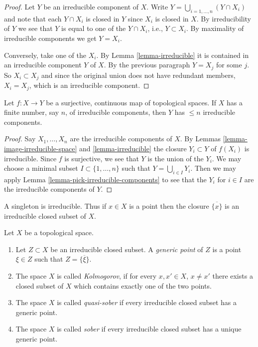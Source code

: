 \begin{proof}
Let $Y$ be an irreducible component of $X$. Write
$Y = \bigcup_{i = 1, \ldots, n} (Y \cap X_i)$
and note that each $Y \cap X_i$ is closed in $Y$ since $X_i$ is closed in $X$.
By irreducibility of $Y$ we see that $Y$ is equal to one of the $Y \cap X_i$,
i.e., $Y \subset X_i$.  By maximality of irreducible components we
get $Y = X_i$.

\medskip\noindent
Conversely, take one of the $X_i$. By Lemma \ref{lemma-irreducible} it is
contained in an irreducible component $Y$ of $X$. By the previous paragraph
$Y = X_j$ for some $j$. So $X_i \subset X_j$ and since the original union does
not have redundant members, $X_i = X_j$, which is an irreducible component.
\end{proof}

\begin{lemma}
\label{lemma-surjective-continuous-irreducible-components}
Let $f : X \to Y$ be a surjective, continuous map of topological spaces.
If $X$ has a finite number, say $n$, of irreducible components, then
$Y$ has $\leq n$ irreducible components.
\end{lemma}

\begin{proof}
Say $X_1, \ldots, X_n$ are the irreducible components of $X$.
By Lemmas \ref{lemma-image-irreducible-space} and \ref{lemma-irreducible}
the closure $Y_i \subset Y$ of $f(X_i)$ is irreducible.
Since $f$ is surjective, we see that $Y$ is the union of the $Y_i$.
We may choose a minimal subset $I \subset \{1, \ldots, n\}$
such that $Y = \bigcup_{i \in I} Y_i$. Then we may apply
Lemma \ref{lemma-pick-irreducible-components} to see that the $Y_i$
for $i \in I$ are the irreducible components of $Y$.
\end{proof}

\noindent
A singleton is irreducible. Thus if $x \in X$ is a point
then the closure $\overline{\{x\}}$ is an irreducible closed
subset of $X$.

\begin{definition}
\label{definition-generic-point}
Let $X$ be a topological space.
\begin{enumerate}
\item Let $Z \subset X$ be an irreducible closed subset.
A {\it generic point} of $Z$ is a point $\xi \in Z$ such
that $Z = \overline{\{\xi\}}$.
\item The space $X$ is called {\it Kolmogorov}, if for every $x, x' \in X$,
$x \not = x'$ there exists a closed subset of $X$ which contains
exactly one of the two points.
\item The space $X$ is called {\it quasi-sober} if every
irreducible closed subset has a generic point.
\item The space $X$ is called {\it sober} if every
irreducible closed subset has a unique generic point.
\end{enumerate}
\end{definition}

